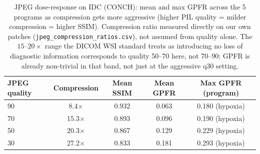 \begin{table}[t]
\centering
\caption{JPEG dose-response on IDC (CONCH): mean and max GPFR across the 5 programs as compression gets more aggressive (higher PIL quality = milder compression = higher SSIM). Compression ratio measured directly on our own patches (\texttt{jpeg\_compression\_ratios.csv}), not assumed from quality alone. The $15$--$20\times$ range the DICOM WSI standard \citep{dicom_wsi_standard} treats as introducing no loss of diagnostic information corresponds to quality 50--70 here, not 70--90; GPFR is already non-trivial in that band, not just at the aggressive q30 setting.}
\label{tab:jpeg_dose_response}
\begin{tabular}{lcccc}
\toprule
JPEG quality & Compression & Mean SSIM & Mean GPFR & Max GPFR (program) \\
\midrule
90 & 8.4$\times$ & 0.932 & 0.063 & 0.180 (hypoxia) \\
70 & 15.3$\times$ & 0.893 & 0.096 & 0.190 (hypoxia) \\
50 & 20.3$\times$ & 0.867 & 0.129 & 0.229 (hypoxia) \\
30 & 27.2$\times$ & 0.833 & 0.181 & 0.293 (hypoxia) \\
\bottomrule
\end{tabular}
\end{table}
